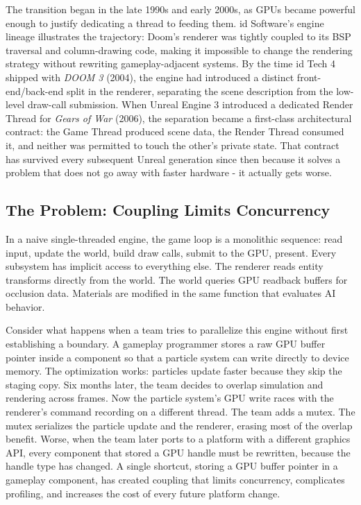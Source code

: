 \documentclass[
  11pt,
  letterpaper,
  DIV=11,
  numbers=noendperiod,
  twoside,
  open=right]{scrreprt}
\begin{document}
The transition began in the late 1990s and early 2000s, as GPUs became
powerful enough to justify dedicating a thread to feeding them. id
Software's engine lineage illustrates the trajectory: Doom's renderer
was tightly coupled to its BSP traversal and column-drawing code, making
it impossible to change the rendering strategy without rewriting
gameplay-adjacent systems. By the time id Tech 4 shipped with \emph{DOOM
3} (2004), the engine had introduced a distinct front-end/back-end split
in the renderer, separating the scene description from the low-level
draw-call submission. When Unreal Engine 3 introduced a dedicated Render
Thread for \emph{Gears of War} (2006), the separation became a
first-class architectural contract: the Game Thread produced scene data,
the Render Thread consumed it, and neither was permitted to touch the
other's private state. That contract has survived every subsequent
Unreal generation since then because it solves a problem that does not
go away with faster hardware - it actually gets worse.

\subsection{The Problem: Coupling Limits
Concurrency}\label{the-problem-coupling-limits-concurrency}

In a naive single-threaded engine, the game loop is a monolithic
sequence: read input, update the world, build draw calls, submit to the
GPU, present. Every subsystem has implicit access to everything else.
The renderer reads entity transforms directly from the world. The world
queries GPU readback buffers for occlusion data. Materials are modified
in the same function that evaluates AI behavior.

Consider what happens when a team tries to parallelize this engine
without first establishing a boundary. A gameplay programmer stores a
raw GPU buffer pointer inside a component so that a particle system can
write directly to device memory. The optimization works: particles
update faster because they skip the staging copy. Six months later, the
team decides to overlap simulation and rendering across frames. Now the
particle system's GPU write races with the renderer's command recording
on a different thread. The team adds a mutex. The mutex serializes the
particle update and the renderer, erasing most of the overlap benefit.
Worse, when the team later ports to a platform with a different graphics
API, every component that stored a GPU handle must be rewritten, because
the handle type has changed. A single shortcut, storing a GPU buffer
pointer in a gameplay component, has created coupling that limits
concurrency, complicates profiling, and increases the cost of every
future platform change.
\end{document}
